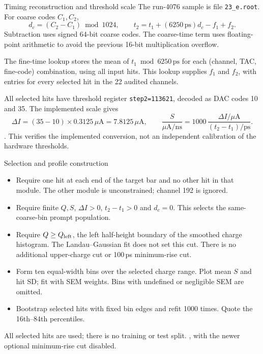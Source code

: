\begin{frame}{Timing reconstruction and threshold scale}
\small
The run-4076 sample is file \texttt{23\_e.root}. For coarse codes $C_1,C_2$,
\[
 d_c=(C_2-C_1)\bmod1024,\qquad
 t_2=t_1+(6250\,\mathrm{ps})d_c-f_1+f_2.
\]
Subtraction uses signed 64-bit coarse codes. The coarse-time term uses
floating-point arithmetic to avoid the previous 16-bit multiplication overflow.

The fine-time lookup stores the mean of $t_1\bmod6250\,\mathrm{ps}$ for each
(channel, TAC, fine-code) combination, using all input hits. This lookup supplies
$f_1$ and $f_2$, with entries for every selected hit in the 22 audited channels.

All selected hits have threshold register \texttt{step2=113621}, decoded as
DAC codes 10 and 35. The implemented scale gives
\[
 \Delta I=(35-10)\times0.3125\,\mu\mathrm{A}=7.8125\,\mu\mathrm{A},\qquad
 \frac{S}{\mu\mathrm{A/ns}}=1000\,\frac{\Delta I/\mu\mathrm{A}}{(t_2-t_1)/\mathrm{ps}}.
\]
{\scriptsize {}.
This verifies the implemented conversion, not an independent calibration of the hardware thresholds.}
\end{frame}

\begin{frame}{Selection and profile construction}
\small
\begin{itemize}
\item Require one hit at each end of the target bar and no other hit in that
module. The other module is unconstrained; channel 192 is ignored.
\item Require finite $Q,S$, $\Delta I>0$, $t_2-t_1>0$ and $d_c=0$.
This selects the same-coarse-bin prompt population.
\item Require $Q\geq Q_{\rm left}$, the left half-height boundary of the
smoothed charge histogram. The Landau--Gaussian fit does not set this cut.
There is no additional upper-charge cut or 100\,ps minimum-rise cut.
\item Form ten equal-width bins over the selected charge range. Plot mean $S$
and hit SD; fit with SEM weights. Bins with undefined or negligible SEM are omitted.
\item Bootstrap selected hits with fixed bin edges and refit 1000 times.
Quote the 16th--84th percentiles.
\end{itemize}
{\scriptsize All selected hits are used; there is no training or test split.
,
with the newer optional minimum-rise cut disabled.}
\end{frame}

